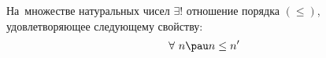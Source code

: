 
    На~множестве натуральных чисел $\exists!$ отношение порядка $(\leq)$, удовлетворяющее следующему свойству:
    \[\forall\  n\pau n\leq n'\]
